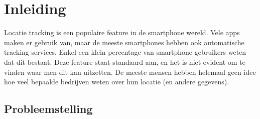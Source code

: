 
\chapter{Inleiding}
\label{ch:inleiding}

Locatie tracking is een populaire feature in de smartphone wereld. Vele apps maken er gebruik van, maar de meeste smartphones hebben ook automatische tracking services. Enkel een klein percentage van smartphone gebruikers weten dat dit bestaat. Deze feature staat standaard aan, en het is niet evident om te vinden waar men dit kan uitzetten. De meeste mensen hebben helemaal geen idee hoe veel bepaalde bedrijven weten over hun locatie (en andere gegevens).


\iffalse De inleiding moet de lezer net genoeg informatie verschaffen om het onderwerp te begrijpen en in te zien waarom de onderzoeksvraag de moeite waard is om te onderzoeken. In de inleiding ga je literatuurverwijzingen beperken, zodat de tekst vlot leesbaar blijft. Je kan de inleiding verder onderverdelen in secties als dit de tekst verduidelijkt. Zaken die aan bod kunnen komen in de inleiding~\autocite{Pollefliet2011}:

\begin{itemize}
  \item context, achtergrond
  \item afbakenen van het onderwerp
  \item verantwoording van het onderwerp, methodologie
  \item probleemstelling
  \item onderzoeksdoelstelling
  \item onderzoeksvraag
  \item \ldots
\end{itemize}

\fi

\section{Probleemstelling}
\label{sec:probleemstelling}

\iffalse
Uit je probleemstelling moet duidelijk zijn dat je onderzoek een meerwaarde heeft voor een concrete doelgroep. De doelgroep moet goed gedefinieerd en afgelijnd zijn. Doelgroepen als ``bedrijven,'' ``KMO's,'' systeembeheerders, enz.~zijn nog te vaag. Als je een lijstje kan maken van de personen/organisaties die een meerwaarde zullen vinden in deze bachelorproef (dit is eigenlijk je steekproefkader), dan is dat een indicatie dat de doelgroep goed gedefinieerd is. Dit kan een enkel bedrijf zijn of zelfs één persoon (je co-promotor/opdrachtgever).
\fi

